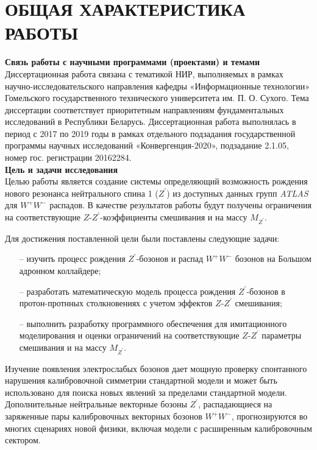 \chapter*{ОБЩАЯ ХАРАКТЕРИСТИКА РАБОТЫ}
\textbf{Связь работы с научными программами (проектами) и темами}\\

Диссертационная работа связана с тематикой НИР, выполняемых в рамках научно-исследовательского направления кафедры «Информационные технологии» Гомельского государственного технического университета им. П. О. Сухого.
Тема диссертации соответствует приоритетным направлениям
фундаментальных исследований в Республики Беларусь. Диссертационная
работа выполнялась в период с 2017 по 2019 годы в рамках отдельного
подзадания государственной программы научных исследований
«Конвергенция-2020», подзадание 2.1.05, номер гос. регистрации 20162284.
\\

\textbf{Цель и задачи исследования}\\

Целью работы является создание системы определяющий возможность рождения нового резонанса нейтрального спина 1 (${Z}^{\prime}$) 
из доступных данных групп \textit{ATLAS} для ${W}^{+}{W}^{-}$ распадов. В качестве результатов работы будут получены 
ограничения на соответствующие $Z$-${Z}^{\prime}$-коэффициенты смешивания и на массу $M_{Z^\prime}$.

Для достижения поставленной цели были поставлены следующие задачи:

\begin{enumerate}
	\item[--] изучить процесс рождения ${Z}^{\prime}$-бозонов и распад ${W}^{+}{W}^{-}$ бозонов на Большом адронном коллайдере;
	
	\item[--] разработать математическую модель процесса рождения ${Z}^{\prime}$-бозонов в протон-протнных столкновениях с учетом эффектов $Z$-${Z}^{\prime}$ смешивания;
	
	\item[--] выполнить разработку программного обеспечения для имитационного моделирования и оценки ограничений на соответствующие $Z$-${Z}^{\prime}$ параметры смешивания и на массу $M_{Z^\prime}$.
	
\end{enumerate}

Изучение появления электрослабых бозонов дает мощную проверку спонтанного нарушения 
калибровочной симметрии стандартной модели и может быть использовано для поиска новых явлений за пределами стандартной модели. 
Дополнительные нейтральные векторные бозоны ${Z}^{\prime}$, распадающиеся на заряженные пары калибровочных векторных бозонов ${W}^{+}{W}^{-}$, 
прогнозируются во многих сценариях новой физики, включая модели с расширенным калибровочным сектором.
\\

